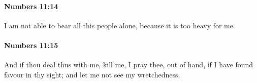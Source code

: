 		\paragraph{Numbers 11:14} %
			\label{NUMBERS-11-14}

			I am not able to bear all this people alone, because it is too heavy for me.


		\paragraph{Numbers 11:15} %
			\label{NUMBERS-11-15}

			And if thou deal thus with me, kill me, I pray thee, out of hand, if I have found favour in thy sight; and let me not see my wretchedness.


